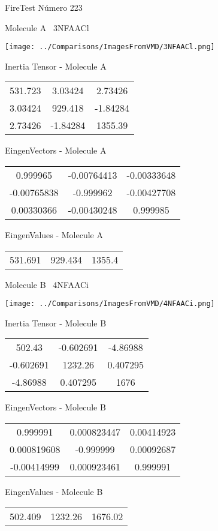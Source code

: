 \vtab[-3cm]
\begin{center}
{\large FireTest \tab Número 223}
\end{center}
\begin{multicols}{2}
\begin{center}

Molecule A \
3NFAACl

\texttt{[image: ../Comparisons/ImagesFromVMD/3NFAACl.png]}

Inertia Tensor - Molecule A \\
\begin{tabular}{|c c c|}
531.723	 & 	3.03424	 & 	2.73426	 \\
3.03424	 & 	929.418	 & 	-1.84284	 \\
2.73426	 & 	-1.84284	 & 	1355.39
\end{tabular}

\vtab
 EingenVectors - Molecule A     \\
\begin{tabular}{|c c c|}
0.999965	 & 	-0.00764413	 & 	-0.00333648	 \\
-0.00765838	 & 	-0.999962	 & 	-0.00427708	 \\
0.00330366	 & 	-0.00430248	 & 	0.999985
\end{tabular}

\vtab
 EingenValues - Molecule A     \\
\begin{tabular}{|c c c|}
531.691	 & 	929.434	 & 	1355.4	 \\
\end{tabular}
\columnbreak

Molecule B \
4NFAACi

\texttt{[image: ../Comparisons/ImagesFromVMD/4NFAACi.png]}

Inertia Tensor - Molecule B \\
\begin{tabular}{|c c c|}
502.43	 & 	-0.602691	 & 	-4.86988	 \\
-0.602691	 & 	1232.26	 & 	0.407295	 \\
-4.86988	 & 	0.407295	 & 	1676
\end{tabular}

\vtab
 EingenVectors - Molecule B     \\
\begin{tabular}{|c c c|}
0.999991	 & 	0.000823447	 & 	0.00414923	 \\
0.000819608	 & 	-0.999999	 & 	0.00092687	 \\
-0.00414999	 & 	0.000923461	 & 	0.999991
\end{tabular}

\vtab
 EingenValues - Molecule B     \\
\begin{tabular}{|c c c|}
502.409	 & 	1232.26	 & 	1676.02	 \\
\end{tabular}

\end{center}
\end{multicols}

